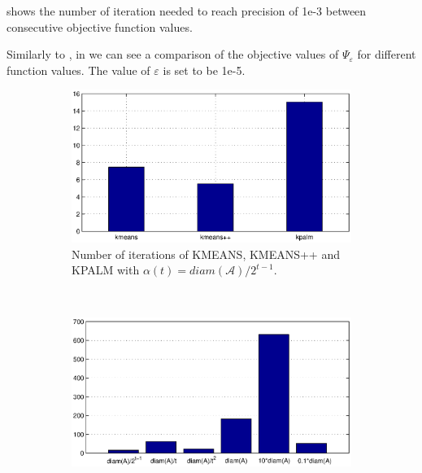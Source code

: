\documentclass[11pt]{article}
\numberwithin{equation}{section}
\begin{document}

 shows the number of iteration needed to reach precision of 1e-3 between consecutive objective function values.

Similarly to , in  we can see a comparison of the objective values of $\Psi_{\varepsilon}$ for different function values. The value of $\varepsilon$ is set to be 1e-5.

\begin{figure}[ht]
    \centering
    \begin{subfigure}[b]{0.8\textwidth}
        \includegraphics[width=\textwidth]{iterations_algs_comparison}
        \caption{Number of iterations of KMEANS, KMEANS++ and KPALM with $\alpha(t)=diam(\mathcal{A})/2^{t-1}$.}
        \label{fig:iters_algs_comp}
    \end{subfigure}
    ~ %
    \begin{subfigure}[b]{0.8\textwidth}
        \includegraphics[width=\textwidth]{iterations_dynamic_alpha_kpalm_comparison}

\end{subfigure}
\end{figure}
\end{document}
